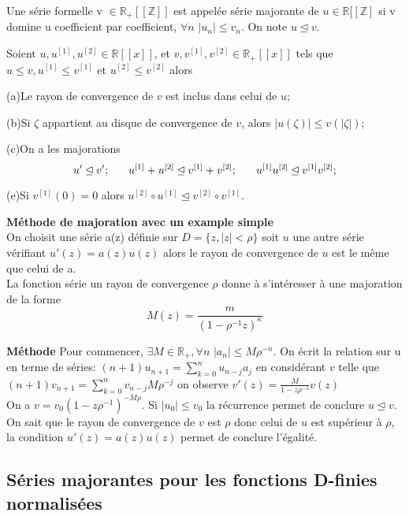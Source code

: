 \documentclass[a4paper,10.5pt]{article}
\begin{document}
	\begin{definition} Une série formelle v $\in \mathbb{R}_{+}[[\mathbb{Z}]]$ est appelée série majorante de $ u \in \mathbb{R}[[\mathbb{Z}]$ si v domine u coefficient par coefficient, $\forall n$ $ |u_{n}|\leq v_{n}$. On note $u \unlhd v$.
	\end{definition}
	
	\begin{proposition} Soient $u,u^{[1]},u^{[2]}\in \mathbb{R}[[x]]$, et $v,v^{[1]},v^{[2]} \in \mathbb{R}_{+}[[x]]$ tels que $u\leq v,u^{[1]}\leq v^{[1]}$ et $u^{[2]}\leq v^{[2]}$ alors
		
		(a)Le rayon de convergence de $v$ est inclus dans celui de $u$;
		
		(b)Si $\zeta$ appartient au disque de convergence de $v$, alors $|u(\zeta)|\leq v(|\zeta|)$;
		
		(c)On a les majorations
		\[u' \unlhd v'; \hspace{6mm} u^{[1]}+u^{[2]}\unlhd v^{[1]}+v^{[2]}; \hspace{6mm}u^{[1]}u^{[2]}\unlhd v^{[1]}v^{[2]}; \]
		
		(e)Si $v^{[1]}(0)=0$ alors $ u^{[2]} \circ u^{[1]} \unlhd v^{[2]}\circ v^{[1]}$.
		
	\end{proposition}
	
	\noindent\textbf{Méthode de majoration avec un example simple}\\
	On choisit une série a(z) définie sur $D=\{z,|z|<\rho\}$ soit $u$ une autre série vérifiant $u'(z)=a(z)u(z)$ alors le rayon de convergence de $u$ est le même que celui de a.\\
	La fonction série un rayon de convergence $\rho$ donne à s'intéresser à une majoration de la forme
	\[M(z)=\frac{m}{(1-\rho^{-1} z)^{\kappa}}\] 
	
	\noindent\textbf{Méthode} Pour commencer, $\exists M \in \mathbb{R}_{+}, \forall n$ $|a_{n}|\leq M \rho^{-n}$.
	On écrit la relation sur u en terme de séries: $(n+1)u_{n+1}=\sum_{k=0}^{n}u_{n-j}a_{j}$ en considérant $v$ telle que  $(n+1)v_{n+1}=\sum_{k=0}^{n}v_{n-j}M\rho^{-j}$ on observe $v'(z)=\frac{M}{1-z\rho^{-1}}v(z)$ \\
	On a $v=v_{0}(1-z\rho^{-1})^{-M\rho}$. Si $|u_{0}| \leq v_{0}$ la récurrence permet de conclure $ u\unlhd v$. On sait que le rayon de convergence de $v$ est $\rho$ donc celui de $u$ est supérieur à $\rho$, la condition $u'(z)=a(z)u(z)$ permet de conclure l'égalité.
	
	\subsection{Séries majorantes pour les fonctions D-finies normalisées}
	
\end{document}

